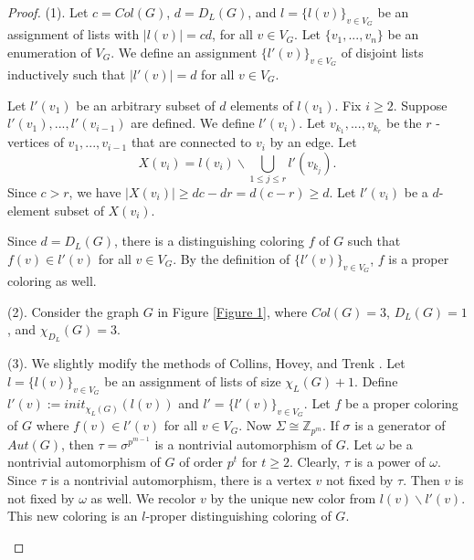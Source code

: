\documentclass[12pt,reqno,a4paper]{amsart}
\theoremstyle{definition}
\begin{document}
\begin{proof}
(1). Let $c=Col(G)$, $d=D_{L}(G)$, and $l=\{l(v)\}_{v\in V_G}$ be an assignment of lists with $|l(v)| = cd$, for all $v\in V_G$. Let $\{v_{1},...,v_{n}\}$ be an enumeration of $V_{G}$. 
We define an assignment $\{l'(v)\}_{v\in V_{G}}$ of disjoint lists inductively such that $\vert l'(v)\vert = d$ for all $v\in V_G$. 

Let $l'(v_{1})$ be an arbitrary subset of $d$ elements of $l(v_{1})$.
Fix $i\geq 2$. Suppose $l'(v_{1}),..., l'(v_{i-1})$ are defined. We define $l'(v_{i})$. Let $v_{k_1},...,v_{k_r}$ be the $r$ -vertices of $v_{1},...,v_{i-1}$ that are connected to $v_{i}$ by an edge.
Let
    \[X(v_{i}) = l(v_{i})\backslash \bigcup_{1\leq j \leq r} l'(v_{k_{j}}).\]
Since $c>r$, we have
        $\vert X(v_{i}) \vert\geq dc - dr = d(c-r)\geq d.$
Let $l'(v_{i})$ be a $d$-element subset of $X(v_{i})$.

Since $d=D_{L}(G)$, there is a distinguishing coloring $f$ of $G$ such that $f(v)\in l'(v)$ for all $v\in V_{G}$.
By the definition of $\{l'(v)\}_{v\in V_{G}}$, $f$ is a proper coloring as well.

(2). Consider the graph $G$ in Figure \ref{Figure 1}, where $Col(G) = 3$, $D_{L}(G) = 1$, and $\chi_{D_{L}}(G) = 3$.

(3). We slightly modify the methods of Collins, Hovey, and Trenk \cite[Theorem 4.2]{CHT2009}. Let $l=\{l(v)\}_{v\in V_G}$ be an assignment of lists of size
$\chi_{L}(G)+1$. Define $l'(v):=init_{\chi_{L}(G)}(l(v))$ and $l'=\{l'(v)\}_{v\in V_{G}}$. Let $f$ be a proper coloring of $G$ where $f(v) \in l'(v)$ for all $v\in V_{G}$.
Now $\Sigma\cong \mathbb{Z}_{p^{m}}$. If $\sigma$ is a generator of $Aut(G)$, then $\tau=\sigma^{p^{m-1}}$ is a nontrivial automorphism of $G$. Let $\omega$ be a nontrivial automorphism of $G$ of order $p^{t}$ for $t\geq 2$. Clearly, $\tau$ is a power of $\omega$. Since $\tau$ is a nontrivial automorphism, there is a vertex $v$ not fixed by $\tau$. Then $v$ is not fixed by $\omega$ as well. We recolor $v$ by the unique new color from $l(v)\backslash l'(v)$. This new coloring is an $l$-proper distinguishing coloring of $G$.

\begin{figure}[!ht]
\centering
\begin{minipage}{\textwidth}
\centering
{}
\end{minipage}
\end{figure}
\end{proof}
\end{document}
